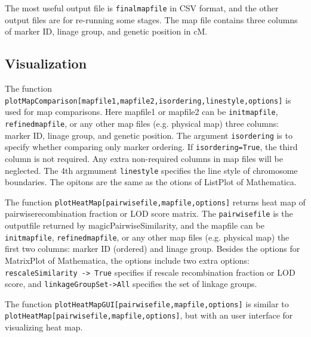 \documentclass[12pt]{article}
\begin{document}
The most useful output file is \verb|finalmapfile| in CSV format, and the other output files are for re-running some stages. The map file contains three columns of marker ID, linage group, and genetic position in cM. 

\subsection{Visualization}

The function \verb|plotMapComparison[mapfile1,mapfile2,isordering,linestyle,options]| is used for map comparisons. Here mapfile1 or mapfile2 can be \verb|initmapfile|, \verb|refinedmapfile|, or any other map files (e.g. physical map) three columns: marker ID, linage group, and genetic position. The argument \verb|isordering| is to specify whether comparing only marker ordering. If \verb|isordering=True|, the third column is not required. Any extra non-required columns in map files will be neglected. The 4th argmument \verb|linestyle| specifies the line style of chromosome boundaries. The opitons are the same as the otions of ListPlot of Mathematica. 

The function \verb|plotHeatMap[pairwisefile,mapfile,options]| returns heat map of pairwiserecombination fraction or LOD score matrix. The \verb|pairwisefile| is the outputfile returned by magicPairwiseSimilarity, and the mapfile can be \verb|initmapfile|, \verb|refinedmapfile|, or any other map files (e.g. physical map) the first two columns: marker ID (ordered) and linage group. Besides the options for MatrixPlot of Mathematica, the options include two extra options: \verb|rescaleSimilarity -> True| specifies if rescale recombination fraction or LOD score, and \verb|linkageGroupSet->All| specifies the set of linkage groups. 

The function \verb|plotHeatMapGUI[pairwisefile,mapfile,options]| is similar to\\ \verb|plotHeatMap[pairwisefile,mapfile,options]|, but with an user interface for visualizing heat map. 

%
%
\end{document}
